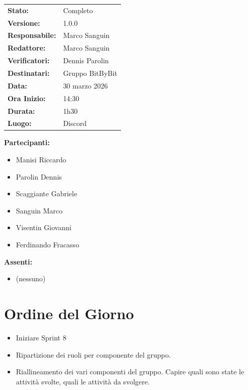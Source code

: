 \documentclass[a4paper,12pt]{article}
\begin{document}
\begin{tcolorbox}
\begin{tabularx}{\textwidth}{@{}l X@{}}
\textbf{Stato:} & Completo\\
\textbf{Versione:} & 1.0.0\\
\textbf{Responsabile:} & Marco Sanguin\\
\textbf{Redattore:} & Marco Sanguin \\
\textbf{Verificatori:} & Dennis Parolin\\
\textbf{Destinatari:} & Gruppo BitByBit\\
\textbf{Data:} & 30 marzo 2026 \\
\textbf{Ora Inizio:} & 14:30 \\
\textbf{Durata:} & 1h30 \\
\textbf{Luogo:} & Discord \\
\end{tabularx}
\end{tcolorbox}

\vspace{0.4cm}
\textbf{Partecipanti:}
\begin{itemize}
    \item Manisi Riccardo
    \item Parolin Dennis
    \item Scaggiante Gabriele
    \item Sanguin Marco
    \item Visentin Giovanni
    \item Ferdinando Fracasso
\end{itemize}

\textbf{Assenti:}
\begin{itemize}
    \item (nessuno)
\end{itemize}

\clearpage

\vspace{0.5cm}

\vspace{0.8cm}

\clearpage
\tableofcontents
\thispagestyle{empty} %
\clearpage

\section{Ordine del Giorno}
\begin{itemize}
    \item Iniziare Sprint 8
    \item Ripartizione dei ruoli per componente del gruppo.
    \item Riallineamento dei vari componenti del gruppo. Capire quali sono state le attività svolte, quali le attività da svolgere.
\end{itemize}
\end{document}
